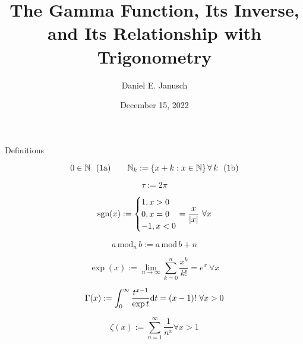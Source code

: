 \documentclass[12pt]{article}
\begin{document}
\title{The Gamma Function, Its Inverse, and Its Relationship with Trigonometry}
\author{Daniel E. Janusch}
\date{December 15, 2022} %
\maketitle

\begin{section}{Definitions}

	\begin{equation}
		0\in\mathbb N~~(1\text a)\hspace{2em}\mathbb N_k:=\left\{x+k:x\in\mathbb N\right\}\forall\,k~~(1\text b)
	\end{equation}

	\vspace{-0.065em}\begin{equation}
		\tau:=2\pi
	\end{equation}

	\vspace{-0.065em}\begin{equation}
		\text{sgn}(x):=\begin{cases}
			1,x>0\\
			0,x=0\\
			-1,x<0
		\end{cases}\hspace{-1em}=\dfrac x{|x|}~\forall x
	\end{equation}

	\vspace{-0.065em}\begin{equation}
		a\,\text{mod}_n\,b:=a\,\text{mod}\,b+n
	\end{equation}

	\vspace{-0.065em}\begin{equation}
		\exp(x):=\lim_{n\to\infty}\sum_{k=0}^n\dfrac{x^k}{k!}=e^x~\forall x
	\end{equation}

	\vspace{-0.065em}\begin{equation}
		\Gamma(x):=\int_0^\infty\dfrac{t^{x-1}}{\exp t}\text dt=(x-1)!~\forall x>0
	\end{equation}

	\vspace{-0.065em}\begin{equation}
		\zeta(x):=\sum_{n=1}^\infty\dfrac1{n^x}\forall x>1
	\end{equation}


\end{section}
\end{document}
